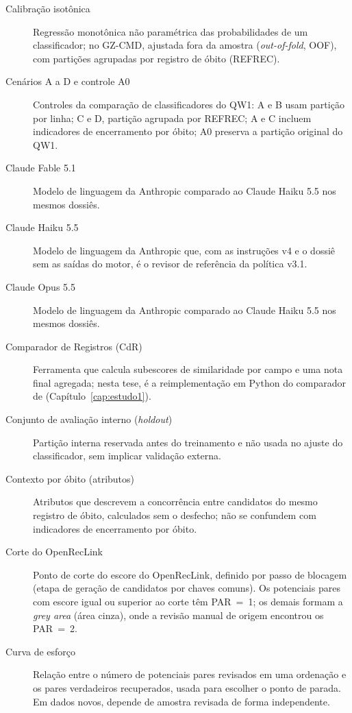 \begin{description}
\item[Calibração isotônica] Regressão monotônica não paramétrica das probabilidades de um classificador; no GZ-CMD, ajustada fora da amostra (\textit{out-of-fold}, OOF), com partições agrupadas por registro de óbito (REFREC).

\item[Cenários A a D e controle A0] Controles da comparação de classificadores do QW1: A e B usam partição por linha; C e D, partição agrupada por REFREC; A e C incluem indicadores de encerramento por óbito; A0 preserva a partição original do QW1.

\item[Claude Fable 5.1] Modelo de linguagem da Anthropic comparado ao Claude Haiku 5.5 nos mesmos dossiês.

\item[Claude Haiku 5.5] Modelo de linguagem da Anthropic que, com as instruções v4 e o dossiê sem as saídas do motor, é o revisor de referência da política v3.1.

\item[Claude Opus 5.5] Modelo de linguagem da Anthropic comparado ao Claude Haiku 5.5 nos mesmos dossiês.

\item[Comparador de Registros (CdR)] Ferramenta que calcula subescores de similaridade por campo e uma nota final agregada; nesta tese, é a reimplementação em Python \cite{Jardim2025comparador} do comparador de  (Capítulo~\ref{cap:estudo1}).

\item[Conjunto de avaliação interno (\textit{holdout})] Partição interna reservada antes do treinamento e não usada no ajuste do classificador, sem implicar validação externa.

\item[Contexto por óbito (atributos)] Atributos que descrevem a concorrência entre candidatos do mesmo registro de óbito, calculados sem o desfecho; não se confundem com indicadores de encerramento por óbito.

\item[Corte do OpenRecLink] Ponto de corte do escore do OpenRecLink, definido por passo de blocagem (etapa de geração de candidatos por chaves comuns). Os potenciais pares com escore igual ou superior ao corte têm PAR~=~1; os demais formam a \textit{grey area} (área cinza), onde a revisão manual de origem encontrou os PAR~=~2.

\item[Curva de esforço] Relação entre o número de potenciais pares revisados em uma ordenação e os pares verdadeiros recuperados, usada para escolher o ponto de parada. Em dados novos, depende de amostra revisada de forma independente.


\end{description}
